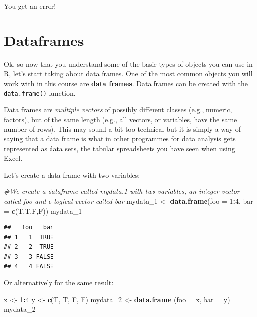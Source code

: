 \documentclass[]{book}
\newenvironment{Shaded}{\begin{snugshade}}{\end{snugshade}}
\newcommand{\CommentTok}[1]{\textcolor[rgb]{0.56,0.35,0.01}{\textit{#1}}}
\newcommand{\DataTypeTok}[1]{\textcolor[rgb]{0.13,0.29,0.53}{#1}}
\newcommand{\DecValTok}[1]{\textcolor[rgb]{0.00,0.00,0.81}{#1}}
\newcommand{\KeywordTok}[1]{\textcolor[rgb]{0.13,0.29,0.53}{\textbf{#1}}}
\newcommand{\NormalTok}[1]{#1}
\newcommand{\OperatorTok}[1]{\textcolor[rgb]{0.81,0.36,0.00}{\textbf{#1}}}
\newcommand{\StringTok}[1]{\textcolor[rgb]{0.31,0.60,0.02}{#1}}
\begin{document}
You get an error!

\hypertarget{dataframes}{%
\section{Dataframes}\label{dataframes}}

Ok, so now that you understand some of the basic types of objects you can use in R, let's start taking about data frames. One of the most common objects you will work with in this course are \textbf{data frames}. Data frames can be created with the \texttt{data.frame()} function.

Data frames are \emph{multiple vectors} of possibly different classes (e.g., numeric, factors), but of the same length (e.g., all vectors, or variables, have the same number of rows). This may sound a bit too technical but it is simply a way of saying that a data frame is what in other programmes for data analysis gets represented as data sets, the tabular spreadsheets you have seen when using Excel.

Let's create a data frame with two variables:

\begin{Shaded}
\begin{Highlighting}[]
\CommentTok{#We create a dataframe called mydata.1 with two variables, an integer vector called foo and a logical vector called bar}
\NormalTok{mydata_}\DecValTok{1}\NormalTok{ <-}\StringTok{ }\KeywordTok{data.frame}\NormalTok{(}\DataTypeTok{foo =} \DecValTok{1}\OperatorTok{:}\DecValTok{4}\NormalTok{, }\DataTypeTok{bar =} \KeywordTok{c}\NormalTok{(T,T,F,F))}
\NormalTok{mydata_}\DecValTok{1}
\end{Highlighting}
\end{Shaded}

\begin{verbatim}
##   foo   bar
## 1   1  TRUE
## 2   2  TRUE
## 3   3 FALSE
## 4   4 FALSE
\end{verbatim}

Or alternatively for the same result:

\begin{Shaded}
\begin{Highlighting}[]
\NormalTok{x <-}\StringTok{ }\DecValTok{1}\OperatorTok{:}\DecValTok{4}
\NormalTok{y <-}\StringTok{ }\KeywordTok{c}\NormalTok{(T, T, F, F)}
\NormalTok{mydata_}\DecValTok{2}\NormalTok{ <-}\StringTok{ }\KeywordTok{data.frame}\NormalTok{ (}\DataTypeTok{foo =}\NormalTok{ x, }\DataTypeTok{bar =}\NormalTok{ y)}
\NormalTok{mydata_}\DecValTok{2}
\end{Highlighting}
\end{Shaded}
\end{document}

